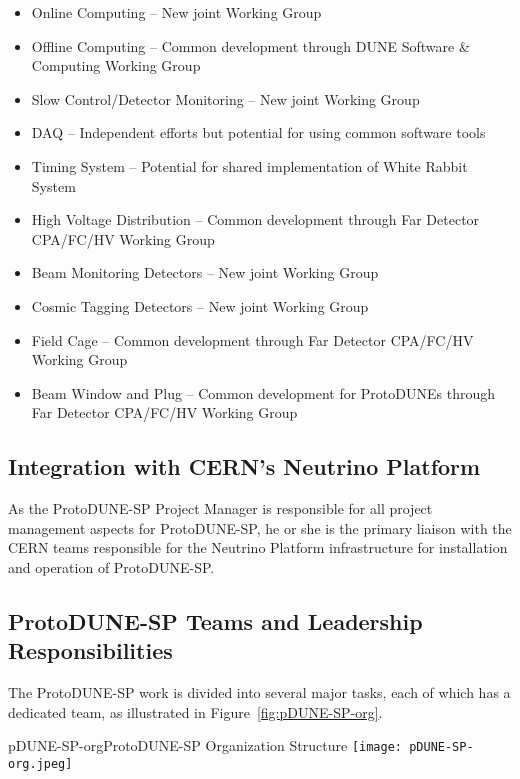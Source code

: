 \begin{itemize}
\item Online Computing -- New joint Working Group
\item Offline Computing -- Common development through DUNE Software \& Computing Working Group
\item Slow Control/Detector Monitoring -- New joint Working Group
\item DAQ -- Independent efforts but potential for using common software tools
\item Timing System -- Potential for shared implementation of White Rabbit System
\item High Voltage Distribution -- Common development through Far Detector CPA/FC/HV Working Group
\item Beam Monitoring Detectors -- New joint Working Group
\item Cosmic Tagging Detectors -- New joint Working Group
\item Field Cage -- Common development through Far Detector CPA/FC/HV Working Group
\item Beam Window and Plug -- Common development for ProtoDUNEs through Far Detector CPA/FC/HV Working Group
\end{itemize}

\subsection{Integration with CERN's Neutrino Platform}

As the ProtoDUNE-SP Project Manager is responsible for all project management aspects for ProtoDUNE-SP, he or she is the primary liaison with the CERN teams responsible for the Neutrino Platform infrastructure for installation and operation of ProtoDUNE-SP.

\subsection{ProtoDUNE-SP Teams and Leadership Responsibilities}

The ProtoDUNE-SP work is divided into several major tasks, each of which has a dedicated team, as illustrated in Figure~\ref{fig:pDUNE-SP-org}.

\begin{cdrfigure}{pDUNE-SP-org}{ProtoDUNE-SP Organization Structure}
  \texttt{[image: pDUNE-SP-org.jpeg]}
\end{cdrfigure}

